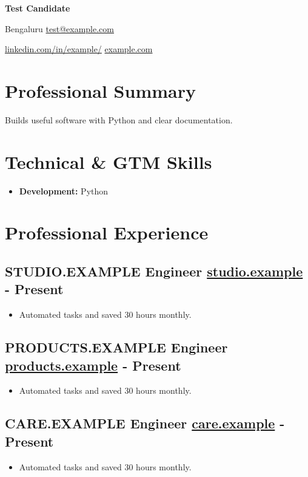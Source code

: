 \documentclass[10pt,a4paper]{article}
\begin{document}
\fontsize{9.1}{10.7}\selectfont
{\fontsize{19}{21}\selectfont\bfseries Test Candidate\par}
Bengaluru \textbar{} \href{mailto:test@example.com}{test@example.com}\par
\href{https://www.linkedin.com/in/example/}{linkedin.com/in/example/} \textbar{} \href{https://example.com}{example.com}\par
\section*{Professional Summary}
Builds useful software with Python and clear documentation.\par
\section*{Technical \& GTM Skills}
\begin{itemize}
\item \textbf{Development:} Python
\end{itemize}
\section*{Professional Experience}
\subsection*{STUDIO.EXAMPLE \textbar{} Engineer \textbar{} \href{https://studio.example}{studio.example}\hfill{ - Present}}
\begin{itemize}
\item Automated tasks and saved 30 hours monthly.
\end{itemize}
\subsection*{PRODUCTS.EXAMPLE \textbar{} Engineer \textbar{} \href{https://products.example}{products.example}\hfill{ - Present}}
\begin{itemize}
\item Automated tasks and saved 30 hours monthly.
\end{itemize}
\subsection*{CARE.EXAMPLE \textbar{} Engineer \textbar{} \href{https://care.example}{care.example}\hfill{ - Present}}
\begin{itemize}
\item Automated tasks and saved 30 hours monthly.
\end{itemize}
\end{document}
